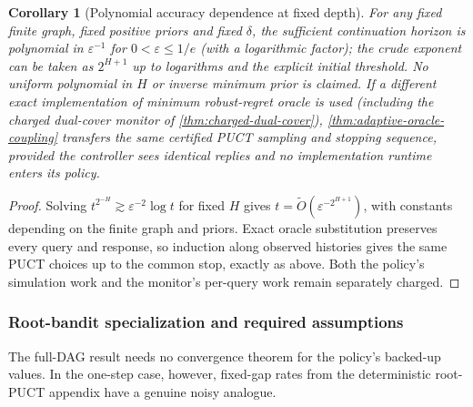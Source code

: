 \documentclass{article}
\theoremstyle{plain}
\newtheorem{corollary}[theorem]{Corollary}
\theoremstyle{definition}
\begin{document}
\begin{corollary}[Polynomial accuracy dependence at fixed depth]
\label{cor:v35poly}
For any fixed finite graph, fixed positive priors and fixed
$\delta$, the sufficient continuation horizon is polynomial in
$\varepsilon^{-1}$ for $0<\varepsilon\le1/e$ (with a logarithmic factor); the crude exponent
can be taken as $2^{H+1}$ up to logarithms and the explicit
initial threshold. No uniform polynomial in $H$ or
inverse minimum prior is claimed.
If a different exact implementation of minimum robust-regret
oracle is used (including the charged dual-cover monitor of \cref{thm:charged-dual-cover}),
\cref{thm:adaptive-oracle-coupling} transfers the same certified
PUCT sampling and stopping sequence, provided the controller sees
identical replies and no implementation runtime enters its policy.
\end{corollary}
\begin{proof}
Solving $t^{2^{-H}}\gtrsim\varepsilon^{-2}\log t$
for fixed $H$ gives $t=\widetilde O(\varepsilon^{-2^{H+1}})$,
with constants depending on the finite graph and priors. Exact oracle
substitution preserves every query and response, so induction along
observed histories gives the same PUCT choices up to the common stop,
exactly as above. Both the policy's simulation work and the monitor's
per-query work remain separately charged.
\end{proof}

\subsubsection{Root-bandit specialization and required assumptions}
\label{sec:v35noisybandit}
The full-DAG result needs no convergence theorem for the policy's
backed-up values. In the one-step case, however, fixed-gap rates from
the deterministic root-PUCT appendix have a genuine noisy analogue.
\end{document}
